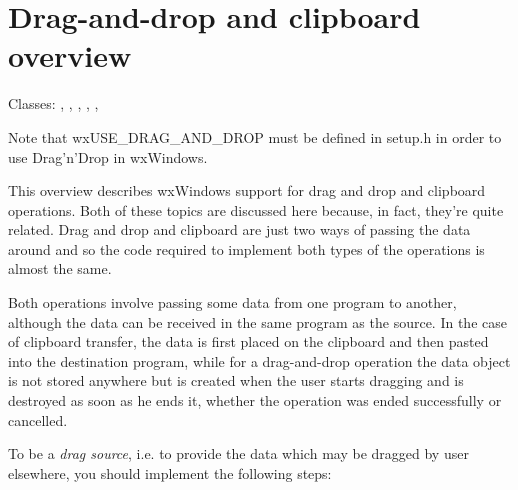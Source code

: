 \section{Drag-and-drop and clipboard overview}\label{wxdndoverview}

Classes: , 
, 
, 
, 
, 

Note that wxUSE\_DRAG\_AND\_DROP must be defined in setup.h in order
to use Drag'n'Drop in wxWindows.

This overview describes wxWindows support for drag and drop and clipboard
operations. Both of these topics are discussed here because, in fact, they're
quite related. Drag and drop and clipboard are just two ways of passing the
data around and so the code required to implement both types of the operations
is almost the same.

Both operations involve passing some data from one program to another,
although the data can be received in the same program as the source. In the case
of clipboard transfer, the data is first placed on the clipboard and then
pasted into the destination program, while for a drag-and-drop operation the
data object is not stored anywhere but is created when the user starts
dragging and is destroyed as soon as he ends it, whether the operation was
ended successfully or cancelled.

To be a {\it drag source}, i.e. to provide the data which may be dragged by
user elsewhere, you should implement the following steps:

